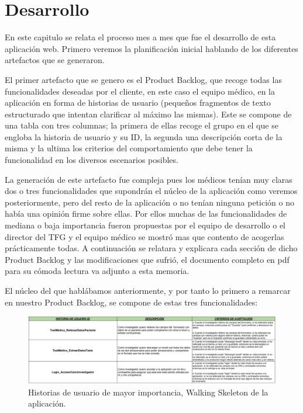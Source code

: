 \chapter{Desarrollo}

En este capitulo se relata el proceso mes a mes que fue el desarrollo de esta aplicación web. Primero veremos la planificación inicial hablando de los diferentes artefactos que se generaron.
\newline

El primer artefacto que se genero es el Product Backlog, que recoge todas las funcionalidades deseadas por el cliente, en este caso el equipo médico, en la aplicación en forma de historias de usuario (pequeños fragmentos de texto estructurado que intentan clarificar al máximo las mismas). Este se compone de una tabla con tres columnas; la primera de ellas recoge el grupo en el que se engloba la historia de usuario y su ID, la segunda una descripción corta de la misma y la ultima los criterios del comportamiento que debe tener la funcionalidad en los diversos escenarios posibles.
\newline

La generación de este artefacto fue compleja pues los médicos tenían muy claras dos o tres funcionalidades que supondrán el núcleo de la aplicación como veremos posteriormente, pero del resto de la aplicación o no tenían ninguna petición o no había una opinión firme sobre ellas. Por ellos muchas de las funcionalidades de mediana o baja importancia fueron propuestas por el equipo de desarrollo o el director del TFG y el equipo médico se mostró mas que contento de acogerlas prácticamente todas. A continuación se relatara y explicara cada sección de dicho Product Backlog y las modificaciones que sufrió, el documento completo en pdf para su cómoda lectura va adjunto a esta memoria.
\newline

El núcleo del que hablábamos anteriormente, y por tanto lo primero a remarcar en nuestro Product Backlog, se compone de estas tres funcionalidades:
\newline

 \begin{figure}[h]
    \centering
     \includegraphics[width=1\textwidth]{images/historiasUsuario-1.jpg}
    \caption{Historias de usuario de mayor importancia, Walking Skeleton de la aplicación.}
\end{figure}
\newpage

